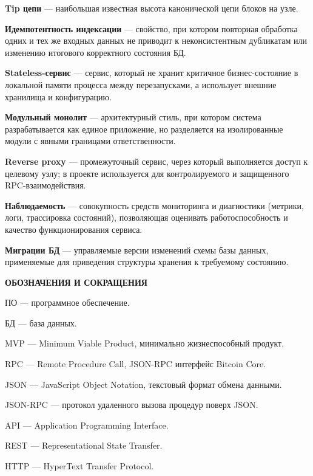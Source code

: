 ﻿\documentclass[14pt,a4paper]{extarticle}
\begin{document}
\noindent \textbf{Tip цепи} — наибольшая известная высота канонической цепи блоков на узле.

\noindent \textbf{Идемпотентность индексации} — свойство, при котором повторная обработка одних и тех же входных данных не приводит к неконсистентным дубликатам или изменению итогового корректного состояния БД.

\noindent \textbf{Stateless-сервис} — сервис, который не хранит критичное бизнес-состояние в локальной памяти процесса между перезапусками, а использует внешние хранилища и конфигурацию.

\noindent \textbf{Модульный монолит} — архитектурный стиль, при котором система разрабатывается как единое приложение, но разделяется на изолированные модули с явными границами ответственности.

\noindent \textbf{Reverse proxy} — промежуточный сервис, через который выполняется доступ к целевому узлу; в проекте используется для контролируемого и защищенного RPC-взаимодействия.

\noindent \textbf{Наблюдаемость} — совокупность средств мониторинга и диагностики (метрики, логи, трассировка состояний), позволяющая оценивать работоспособность и качество функционирования сервиса.

\noindent \textbf{Миграции БД} — управляемые версии изменений схемы базы данных, применяемые для приведения структуры хранения к требуемому состоянию.

\newpage

\begin{center}
\textbf{ОБОЗНАЧЕНИЯ И СОКРАЩЕНИЯ}
\end{center}

\noindent ПО — программное обеспечение.

\noindent БД — база данных.

\noindent MVP — Minimum Viable Product, минимально жизнеспособный продукт.

\noindent RPC — Remote Procedure Call, JSON-RPC интерфейс Bitcoin Core.

\noindent JSON — JavaScript Object Notation, текстовый формат обмена данными.

\noindent JSON-RPC — протокол удаленного вызова процедур поверх JSON.

\noindent API — Application Programming Interface.

\noindent REST — Representational State Transfer.

\noindent HTTP — HyperText Transfer Protocol.
\end{document}

